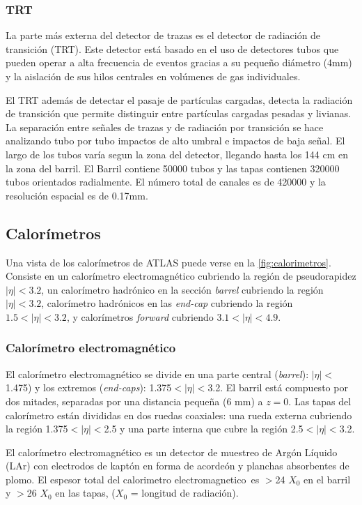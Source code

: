 \subsubsection{TRT}
La parte más externa del detector de trazas es el detector de radiación de
transición (TRT). Este detector está basado en el uso de detectores tubos que
pueden operar a alta frecuencia de eventos gracias a su pequeño diámetro (4mm) y
la aislación de sus hilos centrales en volúmenes de gas individuales.

El TRT además de detectar el pasaje de partículas cargadas, detecta la radiación
de transición que permite distinguir entre partículas cargadas pesadas y
livianas. La separación entre señales de trazas y de radiación por transición se
hace analizando tubo por tubo impactos de alto umbral e impactos de baja señal.
El largo de los tubos varía segun la zona del detector, llegando hasta los 144
cm en la zona del barril. El Barril contiene 50000 tubos y las tapas contienen
320000 tubos orientados radialmente. El número total de canales es de 420000 y
la resolución espacial es de 0.17mm.


\subsection{Calorímetros}

Una vista de los calorímetros de ATLAS puede verse en la \cref{fig:calorimetros}.
Consiste en un calorímetro electromagnético cubriendo la región de pseudorapidez
$|\eta| < 3.2$, un calorímetro hadrónico en la sección \emph{barrel} cubriendo
la región $|\eta| < 3.2$, calorímetro hadrónicos en las \emph{end-cap} cubriendo
la región $1.5 < |\eta| < 3.2$, y calorímetros \emph{forward} cubriendo $3.1 <
|\eta| < 4.9$.


\subsubsection{Calorímetro electromagnético}

El calorímetro electromagnético \cite{caloemTDR} se divide en una parte central
(\emph{barrel}): $|\eta|<$1.475) y los extremos (\emph{end-caps}):
1.375$<|\eta|<$3.2. El barril está compuesto por dos mitades, separadas por una
distancia pequeña (6 mm) a $z = 0$. Las tapas del calorímetro están divididas en
dos ruedas coaxiales: una rueda externa cubriendo la región 1.375$<|\eta|<$2.5 y
una parte interna que cubre la región 2.5$<|\eta|<$3.2.

El calorímetro electromagnético es un detector de muestreo de Argón Líquido
(LAr) con electrodos de kaptón en forma de acordeón y planchas absorbentes de
plomo. El espesor total del calorimetro electromagnetico\ es $>$24 $X_0$ en el
barril y $>$26 $X_0$ en las tapas, ($X_0$ = longitud de radiación).

